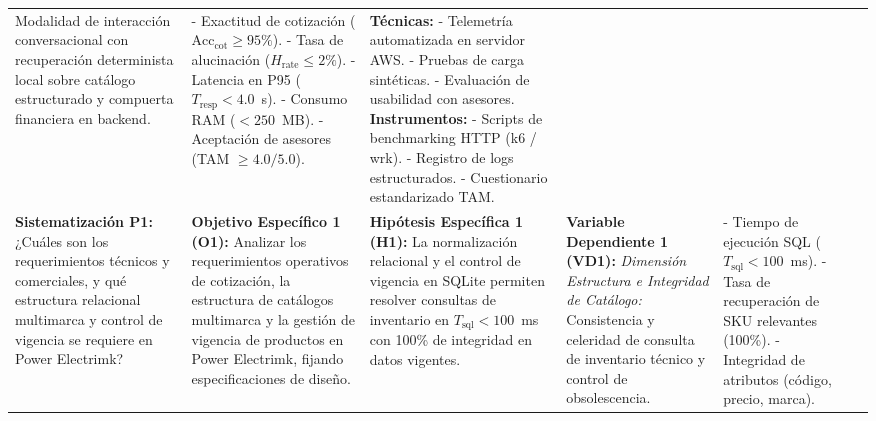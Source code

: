 \begin{landscape}
\begin{table}[H]
\begin{tabular}{p{3.8cm} p{3.8cm} p{3.8cm} p{3.0cm} p{3.0cm} p{3.0cm}}
Modalidad de interacción conversacional con recuperación determinista local sobre catálogo estructurado y compuerta financiera en backend. &
- Exactitud de cotización ($\text{Acc}_{\text{cot}} \ge 95\%$). \newline
- Tasa de alucinación ($H_{\text{rate}} \le 2\%$). \newline
- Latencia en P95 ($T_{\text{resp}} < 4.0$~s). \newline
- Consumo RAM ($< 250$~MB). \newline
- Aceptación de asesores (TAM $\ge 4.0/5.0$). &
\textbf{Técnicas:} \newline
- Telemetría automatizada en servidor AWS. \newline
- Pruebas de carga sintéticas. \newline
- Evaluación de usabilidad con asesores. \newline
\textbf{Instrumentos:} \newline
- Scripts de benchmarking HTTP (k6 / wrk). \newline
- Registro de logs estructurados. \newline
- Cuestionario estandarizado TAM. \\
\addlinespace[2pt]
\textbf{Sistematización P1:} \newline
¿Cuáles son los requerimientos técnicos y comerciales, y qué estructura relacional multimarca y control de vigencia se requiere en Power Electrimk? &
\textbf{Objetivo Específico 1 (O1):} \newline
Analizar los requerimientos operativos de cotización, la estructura de catálogos multimarca y la gestión de vigencia de productos en Power Electrimk, fijando especificaciones de diseño. &
\textbf{Hipótesis Específica 1 (H1):} \newline
La normalización relacional y el control de vigencia en SQLite permiten resolver consultas de inventario en $T_{\text{sql}} < 100$~ms con 100\% de integridad en datos vigentes. &
\textbf{Variable Dependiente 1 (VD1):} \newline
\textit{Dimensión Estructura e Integridad de Catálogo:} \newline
Consistencia y celeridad de consulta de inventario técnico y control de obsolescencia. &
- Tiempo de ejecución SQL ($T_{\text{sql}} < 100$~ms). \newline
- Tasa de recuperación de SKU relevantes (100\%). \newline
- Integridad de atributos (código, precio, marca). \newline

\end{tabular}
\end{table}
\end{landscape}
